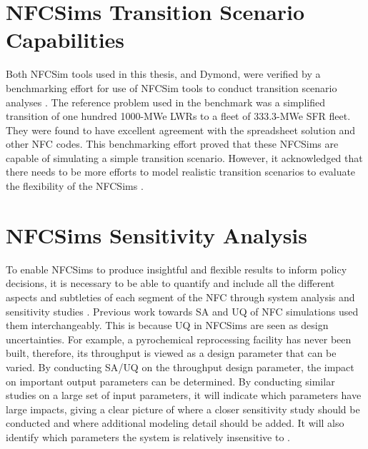 \section{\glspl{NFCSim} Transition Scenario Capabilities}
Both \gls{NFCSim} tools used in this thesis, \Cyclus and Dymond,
were verified by a benchmarking effort for use of 
\gls{NFCSim} tools to conduct transition scenario analyses
\cite{feng_standardized_2016,bae_standardized_2019}.
The reference problem used in the benchmark was a simplified 
transition of one hundred 1000-MWe \glspl{LWR} to a fleet 
of 333.3-MWe \gls{SFR} fleet. 
They were found to have excellent agreement with the 
spreadsheet solution and other \gls{NFC} codes.  
This benchmarking effort proved that these \glspl{NFCSim}
are capable of simulating a simple transition scenario. 
However, it acknowledged that there needs to be more efforts 
to model realistic transition scenarios to evaluate the
flexibility of the \glspl{NFCSim} \cite{feng_standardized_2016}.


\section{\glspl{NFCSim} Sensitivity Analysis}

To enable \glspl{NFCSim} to produce insightful and 
flexible results to inform policy decisions, it is necessary 
to be able to quantify and include all the different aspects and 
subtleties of each segment of the \gls{NFC} through system analysis 
and sensitivity studies \cite{passerini_systematic_2014}. 
Previous work towards \gls{SA} and \gls{UQ} of \gls{NFC} 
simulations used them interchangeably. 
This is because \gls{UQ} in \glspl{NFCSim} are seen as design 
uncertainties. 
For example, a pyrochemical reprocessing facility has never been 
built, therefore, its throughput is viewed as a design parameter 
that can be varied. 
By conducting \gls{SA}/\gls{UQ} on the throughput design 
parameter, the impact on important output parameters can be 
determined. 
By conducting similar studies on a large set of input parameters, 
it will indicate which parameters have large impacts, giving a clear 
picture of where a closer sensitivity study should be conducted and 
where additional modeling detail should be added. 
It will also identify which parameters the system is relatively 
insensitive to \cite{noauthor_effects_2017}. 

